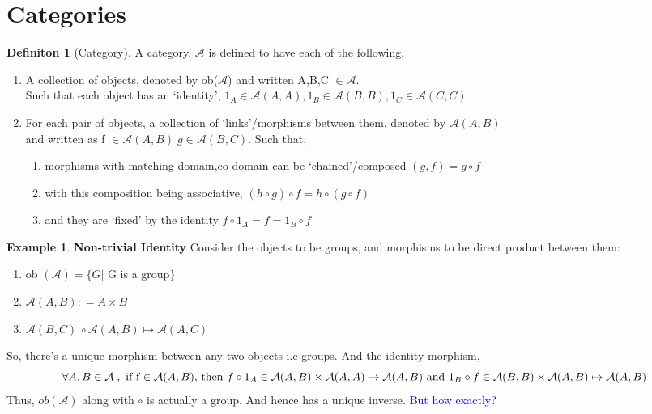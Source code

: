 \documentclass{article}
\theoremstyle{definition}
\newtheorem{example}{Example}[section]
\theoremstyle{definition}
\newtheorem{definition}{Definiton}[section]
\begin{document}
\section{Categories} \label{sec:Categories}
\begin{definition}[Category] %
A category, $\mathcal{A}$ is defined to have each of the following,
\begin{enumerate}[label=(\roman*)]
	\item A collection of objects, denoted by ob($\mathcal{A}$) and written A,B,C $\in \mathcal{A}$.\\
		Such that each object has an `identity', $ 1_A \in \mathcal{A}(A,A) , 1_B \in \mathcal{A}(B,B), 1_C \in \mathcal{A}(C,C)$
	\item For each pair of objects, a collection of `links'/morphisms between them, denoted by $\mathcal{A}(A,B)$ \\and written as f $ \in \mathcal{A}(A,B) \; g \in \mathcal{A}(B,C) $. Such that,
		\begin{enumerate}[label=(\alph*)]
			\item morphisms with matching domain,co-domain can be `chained'/composed $ (g,f)=g \circ f $
			\item with this composition being associative, $ (h \circ g)\circ f=h \circ ( g \circ f) $
			\item and they are `fixed' by the identity $ f \circ 1_A =f= 1_B \circ f $
		\end{enumerate}
\end{enumerate}
\end{definition}
\begin{example} {\textbf{Non-trivial Identity \;}}%
Consider the objects to be groups, and morphisms to be direct product between them:
\begin{enumerate}[label=\roman*]%
	\item ob $ (\mathcal{A}) = \{ G | $  G is a group$ \} $
	\item $  \mathcal{A}(A,B) : = A \times B $
	\item  $ \mathcal{A}(B,C) \ \circ \mathcal{A}(A,B) \mapsto \mathcal{A}(A,C) $
\end{enumerate}
So, there's a unique morphism between any two objects i.e groups. And the identity morphism,
\[ \forall A,B  \in \mathbb{\mathcal{A} }\;, \text{ if f $ \in \mathcal{A}(A,B)$, then }  f \circ 1_A \in \mathcal{A}(A,B) \times \mathcal{A}(A,A) \mapsto \mathcal{A}(A,B) \text{ and } 1_B \circ f \in \mathcal{A}(B,B) \times \mathcal{A}(A,B) \mapsto \mathcal{A}(A,B) \]
Thus, $ ob(\mathcal{A} ) $ along with $ \circ  $ is actually a group. And hence has a unique inverse.
\textcolor{blue} {But how exactly?}
\end{example}
\end{document}
